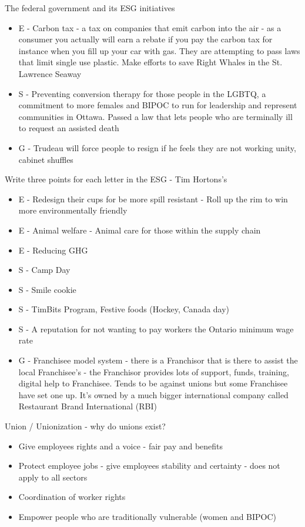 \documentclass[11pt]{article}
\begin{document}
The federal government and its ESG initiatives

\begin{itemize}
    \item E - Carbon tax - a tax on companies that emit carbon into the air - as a consumer you actually will earn a rebate if you pay the carbon tax for instance when you fill up your car with gas. They are attempting to pass laws that limit single use plastic. Make efforts to save Right Whales in the St. Lawrence Seaway
    \item S - Preventing conversion therapy for those people in the LGBTQ, a commitment to more females and BIPOC to run for leadership and represent communities in Ottawa. Passed a law that lets people who are terminally ill to request an assisted death
    \item G - Trudeau will force people to resign if he feels they are not working unity, cabinet shuffles
\end{itemize}

Write three points for each letter in the ESG - Tim Hortons's

\begin{itemize}
    \item E - Redesign their cups for be more spill resistant - Roll up the rim to win more environmentally friendly
    \item E - Animal welfare - Animal care for those within the supply chain
    \item E - Reducing GHG
    \item S - Camp Day
    \item S - Smile cookie
    \item S - TimBits Program, Festive foods (Hockey, Canada day)
    \item S - A reputation for not wanting to pay workers the Ontario minimum wage rate
    \item G - Franchisee model system - there is a Franchisor that is there to assist the local Franchisee's - the Franchisor provides lots of support, funds, training, digital help to Franchisee. Tends to be against unions but some Franchisee have set one up. It's owned by a much bigger international company called Restaurant Brand International (RBI)
\end{itemize}

Union / Unionization - why do unions exist?
\begin{itemize}
    \item Give employees rights and a voice - fair pay and benefits
    \item Protect employee jobs - give employees stability and certainty - does not apply to all sectors
    \item Coordination of worker rights
    \item Empower people who are traditionally vulnerable (women and BIPOC)
\end{itemize}
\end{document}
